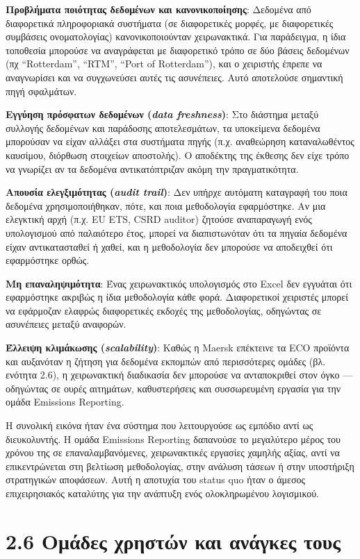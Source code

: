 \textbf{Προβλήματα ποιότητας δεδομένων και κανονικοποίησης}: Δεδομένα
από διαφορετικά πληροφοριακά συστήματα (σε διαφορετικές μορφές, με
διαφορετικές συμβάσεις ονοματολογίας) κανονικοποιούνταν χειρωνακτικά.
Για παράδειγμα, η ίδια τοποθεσία μπορούσε να αναγράφεται με διαφορετικό
τρόπο σε δύο βάσεις δεδομένων (πχ ``Rotterdam'', ``RTM'', ``Port of
Rotterdam''), και ο χειριστής έπρεπε να αναγνωρίσει και να συγχωνεύσει
αυτές τις ασυνέπειες. Αυτό αποτελούσε σημαντική πηγή σφαλμάτων.

\textbf{Εγγύηση πρόσφατων δεδομένων (\emph{data freshness})}: Στο
διάστημα μεταξύ συλλογής δεδομένων και παράδοσης αποτελεσμάτων, τα
υποκείμενα δεδομένα μπορούσαν να είχαν αλλάξει στα συστήματα πηγής (π.χ.
αναθεώρηση καταναλωθέντος καυσίμου, διόρθωση στοιχείων αποστολής). Ο
αποδέκτης της έκθεσης δεν είχε τρόπο να γνωρίζει αν τα δεδομένα
αντικατόπτριζαν ακόμη την πραγματικότητα.

\textbf{Απουσία ελεγξιμότητας (\emph{audit trail})}: Δεν υπήρχε αυτόματη
καταγραφή του ποια δεδομένα χρησιμοποιήθηκαν, πότε, και ποια μεθοδολογία
εφαρμόστηκε. Αν μια ελεγκτική αρχή (π.χ. EU ETS, CSRD auditor) ζητούσε
αναπαραγωγή ενός υπολογισμού από παλαιότερο έτος, μπορεί να
διαπιστωνόταν ότι τα πηγαία δεδομένα είχαν αντικατασταθεί ή χαθεί, και η
μεθοδολογία δεν μπορούσε να αποδειχθεί ότι εφαρμόστηκε ορθώς.

\textbf{Μη επαναληψιμότητα}: Ένας χειρωνακτικός υπολογισμός στο Excel
δεν εγγυάται ότι εφαρμόστηκε ακριβώς η ίδια μεθοδολογία κάθε φορά.
Διαφορετικοί χειριστές μπορεί να εφάρμοζαν ελαφρώς διαφορετικές εκδοχές
της μεθοδολογίας, οδηγώντας σε ασυνέπειες μεταξύ αναφορών.

\textbf{Έλλειψη κλιμάκωσης (\emph{scalability})}: Καθώς η Maersk
επέκτεινε τα ECO προϊόντα και αυξανόταν η ζήτηση για δεδομένα εκπομπών
από περισσότερες ομάδες (βλ. ενότητα 2.6), η χειρωνακτική διαδικασία δεν
μπορούσε να ανταποκριθεί στον όγκο --- οδηγώντας σε ουρές αιτημάτων,
καθυστερήσεις και συσσωρευμένη εργασία για την ομάδα Emissions
Reporting.

Η συνολική εικόνα ήταν ένα σύστημα που λειτουργούσε ως εμπόδιο αντί ως
διευκολυντής. Η ομάδα Emissions Reporting δαπανούσε το μεγαλύτερο μέρος
του χρόνου της σε επαναλαμβανόμενες, χειρωνακτικές εργασίες χαμηλής
αξίας, αντί να επικεντρώνεται στη βελτίωση μεθοδολογίας, στην ανάλυση
τάσεων ή στην υποστήριξη στρατηγικών αποφάσεων. Αυτή η αποτυχία του
status quo ήταν ο άμεσος επιχειρησιακός καταλύτης για την ανάπτυξη ενός
ολοκληρωμένου λογισμικού.

\section{2.6 Ομάδες χρηστών και ανάγκες
τους}\label{ux3bfux3bcux3acux3b4ux3b5ux3c2-ux3c7ux3c1ux3b7ux3c3ux3c4ux3ceux3bd-ux3baux3b1ux3b9-ux3b1ux3bdux3acux3b3ux3baux3b5ux3c2-ux3c4ux3bfux3c5ux3c2}

